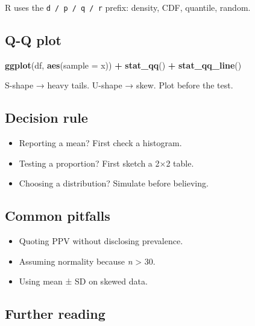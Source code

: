 \documentclass[
]{article}
\newenvironment{Shaded}{\begin{snugshade}}{\end{snugshade}}
\newcommand{\AttributeTok}[1]{\textcolor[rgb]{0.13,0.29,0.53}{#1}}
\newcommand{\FunctionTok}[1]{\textcolor[rgb]{0.13,0.29,0.53}{\textbf{#1}}}
\newcommand{\NormalTok}[1]{#1}
\newcommand{\SpecialCharTok}[1]{\textcolor[rgb]{0.81,0.36,0.00}{\textbf{#1}}}
\providecommand{\tightlist}{%
  \setlength{\itemsep}{0pt}\setlength{\parskip}{0pt}}
\begin{document}
R uses the \texttt{d\ /\ p\ /\ q\ /\ r} prefix: density, CDF, quantile,
random.

\subsection{Q-Q plot}\label{q-q-plot}

\begin{Shaded}
\begin{Highlighting}[]
\FunctionTok{ggplot}\NormalTok{(df, }\FunctionTok{aes}\NormalTok{(}\AttributeTok{sample =}\NormalTok{ x)) }\SpecialCharTok{+} \FunctionTok{stat\_qq}\NormalTok{() }\SpecialCharTok{+} \FunctionTok{stat\_qq\_line}\NormalTok{()}
\end{Highlighting}
\end{Shaded}

S-shape → heavy tails. U-shape → skew. Plot before the test.

\subsection{Decision rule}\label{decision-rule-1}

\begin{itemize}
\tightlist
\item
  Reporting a mean? First check a histogram.
\item
  Testing a proportion? First sketch a 2×2 table.
\item
  Choosing a distribution? Simulate before believing.
\end{itemize}

\subsection{Common pitfalls}\label{common-pitfalls-1}

\begin{itemize}
\tightlist
\item
  Quoting PPV without disclosing prevalence.
\item
  Assuming normality because \emph{n} \textgreater{} 30.
\item
  Using mean ± SD on skewed data.
\end{itemize}

\subsection{Further reading}\label{further-reading-1}
\end{document}
